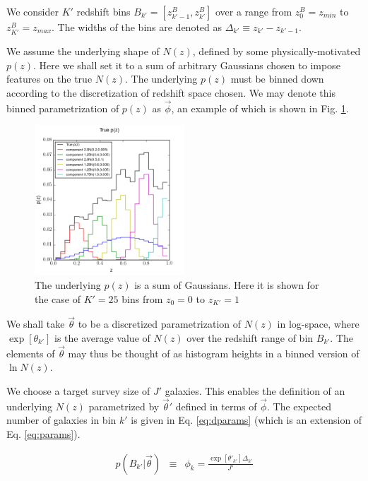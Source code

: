 \documentclass[preprint]{aastex}
\begin{document}
We consider $K'$ redshift bins $B_{k'}=[z^{B}_{k'-1},z^{B}_{k'}]$ over a range from $z^{B}_{0}=z_{min}$ to $z^{B}_{K'}=z_{max}$.  The widths of the bins are denoted as $\Delta_{k'}\equiv z_{k'}-z_{k'-1}$.

We assume the underlying shape of $N(z)$, defined by some physically-motivated $p(z)$.  Here we shall set it to a sum of arbitrary Gaussians chosen to impose features on the true $N(z)$.  The underlying $p(z)$ must be binned down according to the discretization of redshift space chosen.  We may denote this binned parametrization of $p(z)$ as $\vec{\phi}$, an example of which is shown in Fig. \ref{fig:physPz}.

\begin{figure}
\label{fig:physPz}
\includegraphics[width=0.5\textwidth]{physPz.png}
\caption{The underlying $p(z)$ is a sum of Gaussians.  Here it is shown for the case of $K'=25$ bins from $z_{0}=0$ to $z_{K'}=1$}
\end{figure}

We shall take $\vec{\theta}$ to be a discretized parametrization of $N(z)$ in log-space, where $\exp[\theta_{k'}]$ is the average value of $N(z)$ over the redshift range of bin $B_{k'}$.   The elements of $\vec{\theta}$ may thus be thought of as histogram heights in a binned version of $\ln N(z)$.  

We choose a target survey size of $J'$ galaxies.  This enables the definition of an underlying $N(z)$  parametrized by $\vec{\theta}'$ defined in terms of $\vec{\phi}$.  The expected number of galaxies in bin $k'$ is given in Eq. \ref{eq:dparams} (which is an extension of Eq. \ref{eq:params}).  

\begin{eqnarray}
\label{eq:dparams}
p(B_{k'}|\vec{\theta}) &\equiv& \phi_{k} = \frac{\exp[\theta'_{k'}]\Delta_{k'}}{J'}
\end{eqnarray}
\end{document}
